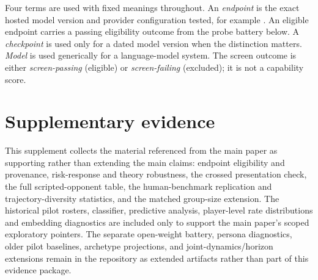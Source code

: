 \documentclass[sigconf,anonymous]{aamas}
\begin{document}
Four terms are used with fixed meanings throughout. An \emph{endpoint} is the
exact hosted model version and provider configuration tested, for example
. An eligible endpoint carries a passing
eligibility outcome from the probe battery below. A
\emph{checkpoint} is used only for a dated model version when the distinction
matters. \emph{Model} is used generically for a language-model system. The
screen outcome is either \emph{screen-passing} (eligible) or
\emph{screen-failing} (excluded); it is not a capability score.

\appendix
\setcounter{secnumdepth}{2}
\setcounter{tocdepth}{2}
\renewcommand{\thesection}{S\arabic{section}}
\renewcommand{\thesubsection}{\thesection.\arabic{subsection}}
\tableofcontents
\section*{Supplementary evidence}
\label{app:extended-results}

\providecommand{\todo}[1]{\textbf{[TODO: #1]}}

\begin{sloppypar}
\noindent
This supplement collects the material referenced from the main paper as
supporting rather than extending the main claims: endpoint eligibility and
provenance, risk-response and theory robustness, the crossed presentation
check, the full scripted-opponent table, the human-benchmark replication and
trajectory-diversity statistics, and the matched group-size extension. The
historical pilot rosters, classifier, predictive analysis, player-level rate
distributions and embedding diagnostics are included only to support the main
paper's scoped exploratory pointers. The separate open-weight battery, persona
diagnostics, older pilot baselines, archetype projections, and
joint-dynamics/horizon extensions remain in the repository as extended
artifacts rather than part of this evidence package.
\end{sloppypar}
\end{document}
